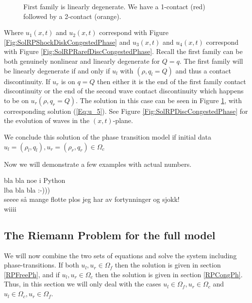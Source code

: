\documentclass[10pt]{article}
\numberwithin{equation}{section}
\begin{document}
\begin{figure}
   
   \caption{First family is linearly degenerate. We have a 1-contact (red) followed by a 2-contact (orange).}
    \label{Fig:u_5}
\end{figure}
Where $u_1(x,t)$ and $u_2(x,t)$ correspond with Figure \ref{Fig:SolRPShockDiskCongestedPhase} and $u_3(x,t)$ and $u_4(x,t)$ correspond with Figure \ref{Fig:SolRPRarefDiscCongestedPhase}. 
Recall the first family can be both genuinely nonlinear and linearly degenerate for $Q = q$. The first family will be linearly degenerate if and only if $u_l$ with $(\rho, q_l = Q)$ and thus a contact discontinuity.  If $u_r$ is on $q = Q$ then either it is the end of the first family contact discontinuity or the end of the second wave contact discontinuity which happens to be on $u_r(\rho, q_r = Q)$. The solution in this case can be seen in Figure \ref{Fig:u_5}, with corresponding solution (\ref{Eq:u_5}). See Figure \ref{Fig:SolRPDiscCongestedPhase} for the evolution of waves in the $(x,t)$-plane.

We conclude this solution of the phase transition model if initial data $u_l = (\rho_l, q_l), u_r = (\rho_r, q_r) \in \Omega_c $

Now we will demonstrate a few examples with actual numbers. 

bla bla noe i Python \\
lba bla bla :-)))
\\ seeee så mange flotte plos jeg har av fortynninger og sjokk! 
\\ wiiii

\subsection{The Riemann Problem for the full model}
We will now combine the two sets of equations and solve the system including phase-transitions. If both $u_l, u_r \in \Omega_f$ then the solution is given in section \ref{RPFreePh}, and if $u_l, u_r \in \Omega_c$ then the solution is given in section \ref{RPCongPh}. Thus, in this section we will only deal with the cases $u_l \in \Omega_f, u_r \in \Omega_c$ and $u_l \in \Omega_c, u_r \in \Omega_f$.
\end{document}

